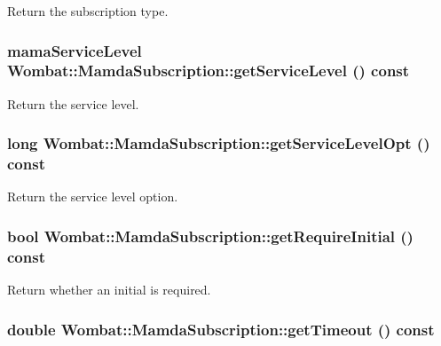 Return the subscription type. 

\hypertarget{classWombat_1_1MamdaSubscription_256737c301cac3ccef868b715c37311f}{
\subsubsection[getServiceLevel]{\setlength{\rightskip}{0pt plus 5cm}mama\-Service\-Level Wombat::Mamda\-Subscription::get\-Service\-Level () const}}
\label{classWombat_1_1MamdaSubscription_256737c301cac3ccef868b715c37311f}


Return the service level. 

\hypertarget{classWombat_1_1MamdaSubscription_cceddcf7fb3bea35760c9b48d1e16389}{
\subsubsection[getServiceLevelOpt]{\setlength{\rightskip}{0pt plus 5cm}long Wombat::Mamda\-Subscription::get\-Service\-Level\-Opt () const}}
\label{classWombat_1_1MamdaSubscription_cceddcf7fb3bea35760c9b48d1e16389}


Return the service level option. 

\hypertarget{classWombat_1_1MamdaSubscription_41dd19a9721732dff1607338c23e45f8}{
\subsubsection[getRequireInitial]{\setlength{\rightskip}{0pt plus 5cm}bool Wombat::Mamda\-Subscription::get\-Require\-Initial () const}}
\label{classWombat_1_1MamdaSubscription_41dd19a9721732dff1607338c23e45f8}


Return whether an initial is required. 

\hypertarget{classWombat_1_1MamdaSubscription_2afe74ffded753f3501b844bd911c36b}{
\subsubsection[getTimeout]{\setlength{\rightskip}{0pt plus 5cm}double Wombat::Mamda\-Subscription::get\-Timeout () const}}
\label{classWombat_1_1MamdaSubscription_2afe74ffded753f3501b844bd911c36b}


